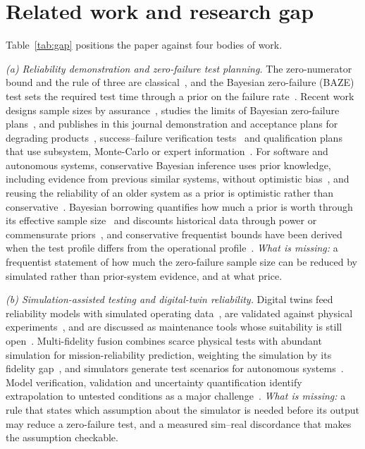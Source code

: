 \section{Related work and research gap}\label{sec:related}

Table~\ref{tab:gap} positions the paper against four bodies of work.



\emph{(a) Reliability demonstration and zero-failure test planning.} The zero-numerator bound and the rule of three are
classical~\cite{hanley1983,meeker2017}, and the Bayesian zero-failure (BAZE) test sets the required test time through a prior on the failure rate~\cite{baze1979}. Recent work designs sample sizes by assurance~\cite{wilson2021assurance}, studies the
limits of Bayesian zero-failure plans~\cite{yoon2025bayesian}, and publishes in this journal demonstration and acceptance
plans for degrading products~\cite{zheng2023gamma,zheng2023acceptance}, success--failure verification
tests~\cite{ding2024truncated} and qualification plans that use subsystem, Monte-Carlo or expert
information~\cite{wang2024monoprop,tan2025weibull}. For software and autonomous systems, conservative Bayesian inference uses prior knowledge, including evidence from previous similar systems, without optimistic bias~\cite{zhao2018perfection,zhao2019cbi,zhao2020operational},
and reusing the reliability of an older system as a prior is optimistic rather than
conservative~\cite{littlewood2020replacement}. Bayesian borrowing quantifies how much a prior is worth through its effective sample size~\cite{morita2008ess} and
discounts historical data through power or commensurate priors~\cite{ibrahim2000power,hobbs2011commensurate}, and
conservative frequentist bounds have been derived when the test profile differs from the operational
profile~\cite{bishop2017profiles}. \emph{What is missing:} a frequentist statement of how much the
zero-failure sample size can be reduced by simulated rather than prior-system evidence, and at what price.

\emph{(b) Simulation-assisted testing and digital-twin reliability.} Digital twins feed reliability models with simulated
operating data~\cite{tao2024subsea}, are validated against physical experiments~\cite{ye2023structuraldt}, and are
discussed as maintenance tools whose suitability is still open~\cite{dwight2026dtmaint}. Multi-fidelity fusion combines
scarce physical tests with abundant simulation for mission-reliability prediction, weighting the simulation by its
fidelity gap~\cite{wang2026fusion}, and simulators generate test scenarios for autonomous
systems~\cite{li2026tugs,riedmaier2020}. Model verification, validation and uncertainty quantification identify extrapolation to untested conditions as a major challenge~\cite{riedmaier2021vvuq}. \emph{What is missing:} a rule that
states which assumption about the simulator is needed before its output may reduce a zero-failure test, and a measured
sim--real discordance that makes the assumption checkable.


